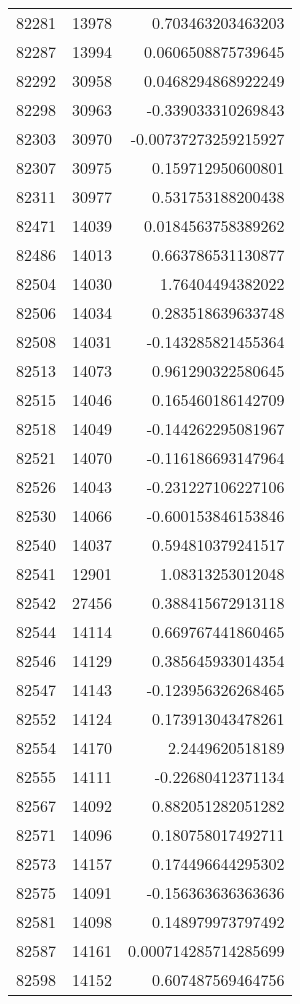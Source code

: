 \begin{tabular}{r | r | r}
82281 & 13978 & 0.703463203463203 \\
82287 & 13994 & 0.0606508875739645 \\
82292 & 30958 & 0.0468294868922249 \\
82298 & 30963 & -0.339033310269843 \\
82303 & 30970 & -0.00737273259215927 \\
82307 & 30975 & 0.159712950600801 \\
82311 & 30977 & 0.531753188200438 \\
82471 & 14039 & 0.0184563758389262 \\
82486 & 14013 & 0.663786531130877 \\
82504 & 14030 & 1.76404494382022 \\
82506 & 14034 & 0.283518639633748 \\
82508 & 14031 & -0.143285821455364 \\
82513 & 14073 & 0.961290322580645 \\
82515 & 14046 & 0.165460186142709 \\
82518 & 14049 & -0.144262295081967 \\
82521 & 14070 & -0.116186693147964 \\
82526 & 14043 & -0.231227106227106 \\
82530 & 14066 & -0.600153846153846 \\
82540 & 14037 & 0.594810379241517 \\
82541 & 12901 & 1.08313253012048 \\
82542 & 27456 & 0.388415672913118 \\
82544 & 14114 & 0.669767441860465 \\
82546 & 14129 & 0.385645933014354 \\
82547 & 14143 & -0.123956326268465 \\
82552 & 14124 & 0.173913043478261 \\
82554 & 14170 & 2.2449620518189 \\
82555 & 14111 & -0.22680412371134 \\
82567 & 14092 & 0.882051282051282 \\
82571 & 14096 & 0.180758017492711 \\
82573 & 14157 & 0.174496644295302 \\
82575 & 14091 & -0.156363636363636 \\
82581 & 14098 & 0.148979973797492 \\
82587 & 14161 & 0.000714285714285699 \\
82598 & 14152 & 0.607487569464756 \\

\end{tabular}
